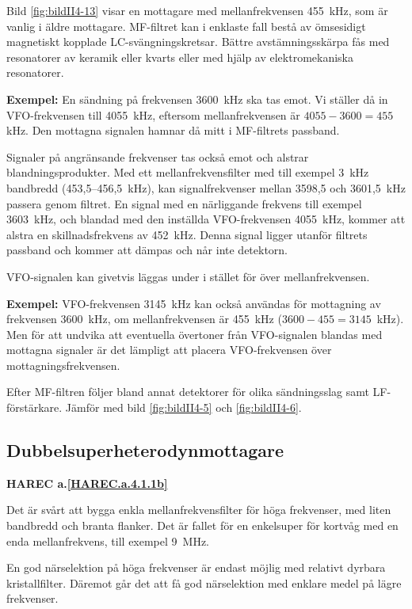 Bild \ref{fig:bildII4-13} visar en mottagare med mellanfrekvensen 455~kHz,
som är vanlig i äldre mottagare.
MF-filtret kan i enklaste fall bestå av ömsesidigt magnetiskt kopplade
LC-svängningskretsar.
Bättre avstämningsskärpa fås med resonatorer av keramik eller kvarts eller med
hjälp av elektromekaniska resonatorer.

\textbf{Exempel:}
En sändning på frekvensen 3600~kHz ska tas emot.
Vi ställer då in VFO-frekvensen till 4055~kHz, eftersom mellanfrekvensen är
\(4055 - 3600 = 455\) kHz.
Den mottagna signalen hamnar då mitt i MF-filtrets passband.

Signaler på angränsande frekvenser tas också emot och alstrar
blandningsprodukter.
Med ett mellanfrekvensfilter med till exempel 3~kHz bandbredd (453,5--456,5~kHz),
kan signalfrekvenser mellan 3598,5 och 3601,5~kHz passera genom filtret.
En signal med en närliggande frekvens till exempel 3603~kHz, och blandad med den
inställda VFO-frekvensen 4055~kHz, kommer att alstra en skillnadsfrekvens av
452~kHz.
Denna signal ligger utanför filtrets passband och kommer att dämpas och når
inte detektorn.

VFO-signalen kan givetvis läggas under i stället för över mellanfrekvensen.

\textbf{Exempel:}
VFO-frekvensen 3145~kHz kan också användas för mottagning av frekvensen
3600~kHz, om mellanfrekvensen är 455~kHz (\(3600 - 455 = 3145\)~kHz).
Men för att undvika att eventuella övertoner från VFO-signalen blandas med
mottagna signaler är det lämpligt att placera VFO-frekvensen över
mottagningsfrekvensen.

Efter MF-filtren följer bland annat detektorer för olika sändningsslag samt
LF-förstärkare.
Jämför med bild \ref{fig:bildII4-5} och \ref{fig:bildII4-6}.

\subsection{Dubbelsuperheterodynmottagare}
\textbf{HAREC a.\ref{HAREC.a.4.1.1b}\label{myHAREC.a.4.1.1b}}

Det är svårt att bygga enkla mellanfrekvensfilter för höga frekvenser,
med liten bandbredd och branta flanker. Det är fallet för en
enkelsuper för kortvåg med en enda mellanfrekvens, till exempel 9~MHz.

En god närselektion på höga frekvenser är endast möjlig med relativt
dyrbara kristallfilter.
Däremot går det att få god närselektion med enklare medel på lägre frekvenser.


